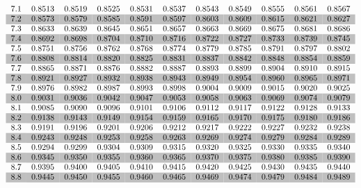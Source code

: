 \documentclass[12pt]{article}
\begin{document}
\begin{equation*}
\begin{tabular}{*{11}{c}}
7.1 & 0.8513 & 0.8519 & 0.8525 & 0.8531 & 0.8537 & 0.8543 & 0.8549 & 0.8555 & 0.8561 & 0.8567 \\
\rowcolor[gray]{0.75}
7.2 & 0.8573 & 0.8579 & 0.8585 & 0.8591 & 0.8597 & 0.8603 & 0.8609 & 0.8615 & 0.8621 & 0.8627 \\
7.3 & 0.8633 & 0.8639 & 0.8645 & 0.8651 & 0.8657 & 0.8663 & 0.8669 & 0.8675 & 0.8681 & 0.8686 \\
\rowcolor[gray]{0.75}
7.4 & 0.8692 & 0.8698 & 0.8704 & 0.8710 & 0.8716 & 0.8722 & 0.8727 & 0.8733 & 0.8739 & 0.8745 \\
7.5 & 0.8751 & 0.8756 & 0.8762 & 0.8768 & 0.8774 & 0.8779 & 0.8785 & 0.8791 & 0.8797 & 0.8802 \\
\rowcolor[gray]{0.75}
7.6 & 0.8808 & 0.8814 & 0.8820 & 0.8825 & 0.8831 & 0.8837 & 0.8842 & 0.8848 & 0.8854 & 0.8859 \\
7.7 & 0.8865 & 0.8871 & 0.8876 & 0.8882 & 0.8887 & 0.8893 & 0.8899 & 0.8904 & 0.8910 & 0.8915 \\
\rowcolor[gray]{0.75}
7.8 & 0.8921 & 0.8927 & 0.8932 & 0.8938 & 0.8943 & 0.8949 & 0.8954 & 0.8960 & 0.8965 & 0.8971 \\
7.9 & 0.8976 & 0.8982 & 0.8987 & 0.8993 & 0.8998 & 0.9004 & 0.9009 & 0.9015 & 0.9020 & 0.9025 \\
\rowcolor[gray]{0.75}
8.0 & 0.9031 & 0.9036 & 0.9042 & 0.9047 & 0.9053 & 0.9058 & 0.9063 & 0.9069 & 0.9074 & 0.9079 \\
8.1 & 0.9085 & 0.9090 & 0.9096 & 0.9101 & 0.9106 & 0.9112 & 0.9117 & 0.9122 & 0.9128 & 0.9133 \\
\rowcolor[gray]{0.75}
8.2 & 0.9138 & 0.9143 & 0.9149 & 0.9154 & 0.9159 & 0.9165 & 0.9170 & 0.9175 & 0.9180 & 0.9186 \\
8.3 & 0.9191 & 0.9196 & 0.9201 & 0.9206 & 0.9212 & 0.9217 & 0.9222 & 0.9227 & 0.9232 & 0.9238 \\
\rowcolor[gray]{0.75}
8.4 & 0.9243 & 0.9248 & 0.9253 & 0.9258 & 0.9263 & 0.9269 & 0.9274 & 0.9279 & 0.9284 & 0.9289 \\
8.5 & 0.9294 & 0.9299 & 0.9304 & 0.9309 & 0.9315 & 0.9320 & 0.9325 & 0.9330 & 0.9335 & 0.9340 \\
\rowcolor[gray]{0.75}
8.6 & 0.9345 & 0.9350 & 0.9355 & 0.9360 & 0.9365 & 0.9370 & 0.9375 & 0.9380 & 0.9385 & 0.9390 \\
8.7 & 0.9395 & 0.9400 & 0.9405 & 0.9410 & 0.9415 & 0.9420 & 0.9425 & 0.9430 & 0.9435 & 0.9440 \\
\rowcolor[gray]{0.75}
8.8 & 0.9445 & 0.9450 & 0.9455 & 0.9460 & 0.9465 & 0.9469 & 0.9474 & 0.9479 & 0.9484 & 0.9489 \\

\end{tabular}
\end{equation*}
\end{document}
